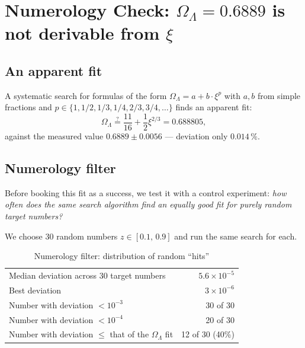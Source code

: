 \section[Numerology check: Omega-Lambda is not derivable from xi]{Numerology Check: \texorpdfstring{\(\Omega_\Lambda = 0.6889\)}{Omega-Lambda = 0.6889} is not derivable from \texorpdfstring{\(\xi\)}{xi}}
\label{sec:numerologie}

\subsection{An apparent fit}

A systematic search for formulas of the form \(\Omega_\Lambda = a + b \cdot \xi^p\) with \(a, b\) from simple fractions and \(p \in \{1, 1/2, 1/3, 1/4, 2/3, 3/4, \dots\}\) finds an apparent fit:
\begin{equation}
\Omega_\Lambda \stackrel{?}{=} \frac{11}{16} + \frac{1}{2} \xi^{2/3} = 0.688805,
\end{equation}
against the measured value \(0.6889 \pm 0.0056\) --- deviation only \(0.014\,\%\).

\subsection{Numerology filter}

Before booking this fit as a success, we test it with a control experiment: \emph{how often does the same search algorithm find an equally good fit for purely random target numbers?}

We choose 30 random numbers \(z \in [0.1,\, 0.9]\) and run the same search for each.

\begin{table}[h]
\centering
\caption{Numerology filter: distribution of random ``hits''}
\begin{tabular}{lr}
\toprule
Median deviation across 30 target numbers & \(5.6 \times 10^{-5}\) \\
Best deviation & \(3 \times 10^{-6}\) \\
Number with deviation \(< 10^{-3}\) & 30 of 30 \\
Number with deviation \(< 10^{-4}\) & 20 of 30 \\
\midrule
Number with deviation \(\leq\) that of the \(\Omega_\Lambda\) fit & 12 of 30 (40\%) \\
\bottomrule
\end{tabular}
\end{table}

